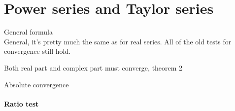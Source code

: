 \section{Power series and Taylor series}
General formula \\

General, it's pretty much the same as for real series. All of the old
tests for convergence still hold.

Both real part and complex part must converge, theorem 2

Absolute convergence

\paragraph{Ratio test}

